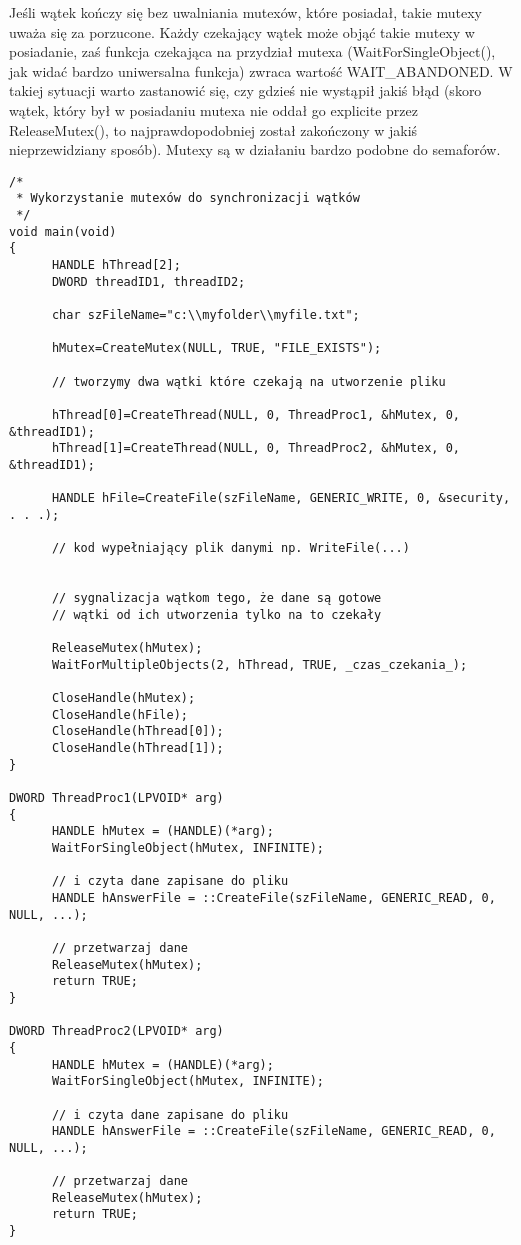 Jeśli wątek kończy się bez uwalniania mutexów, które posiadał, takie mutexy uważa się za porzucone. 
Każdy czekający wątek może objąć takie mutexy w posiadanie, 
zaś funkcja czekająca na przydział mutexa (WaitForSingleObject(), jak widać bardzo uniwersalna funkcja) 
zwraca wartość WAIT\_ABANDONED. W takiej sytuacji warto zastanowić się, czy gdzieś nie wystąpił 
jakiś błąd (skoro wątek, który był w posiadaniu mutexa nie oddał go explicite przez 
ReleaseMutex(), to najprawdopodobniej został zakończony w jakiś nieprzewidziany sposób). 
Mutexy są w działaniu bardzo podobne do semaforów. 

\begin{scriptsize}
\begin{verbatim}
/*
 * Wykorzystanie mutexów do synchronizacji wątków
 */
void main(void)  
{  
      HANDLE hThread[2];  
      DWORD threadID1, threadID2;  

      char szFileName="c:\\myfolder\\myfile.txt";  

      hMutex=CreateMutex(NULL, TRUE, "FILE_EXISTS");  

      // tworzymy dwa wątki które czekają na utworzenie pliku  

      hThread[0]=CreateThread(NULL, 0, ThreadProc1, &hMutex, 0, &threadID1);  
      hThread[1]=CreateThread(NULL, 0, ThreadProc2, &hMutex, 0, &threadID1);  

      HANDLE hFile=CreateFile(szFileName, GENERIC_WRITE, 0, &security, . . .);  

      // kod wypełniający plik danymi np. WriteFile(...)  

  
      // sygnalizacja wątkom tego, że dane są gotowe  
      // wątki od ich utworzenia tylko na to czekały   

      ReleaseMutex(hMutex);  
      WaitForMultipleObjects(2, hThread, TRUE, _czas_czekania_);  

      CloseHandle(hMutex);  
      CloseHandle(hFile);  
      CloseHandle(hThread[0]);  
      CloseHandle(hThread[1]);  
}  

DWORD ThreadProc1(LPVOID* arg)  
{  
      HANDLE hMutex = (HANDLE)(*arg);  
      WaitForSingleObject(hMutex, INFINITE);  

      // i czyta dane zapisane do pliku  
      HANDLE hAnswerFile = ::CreateFile(szFileName, GENERIC_READ, 0, NULL, ...);

      // przetwarzaj dane  
      ReleaseMutex(hMutex);  
      return TRUE;  
}  

DWORD ThreadProc2(LPVOID* arg)  
{  
      HANDLE hMutex = (HANDLE)(*arg);  
      WaitForSingleObject(hMutex, INFINITE);  

      // i czyta dane zapisane do pliku  
      HANDLE hAnswerFile = ::CreateFile(szFileName, GENERIC_READ, 0, NULL, ...);

      // przetwarzaj dane  
      ReleaseMutex(hMutex);  
      return TRUE;  
}  
\end{verbatim}
\end{scriptsize}

